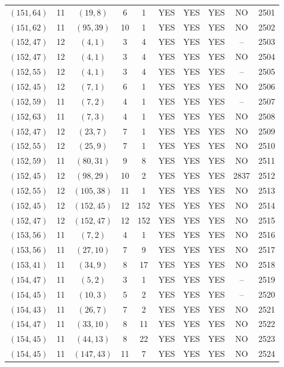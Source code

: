 \begin{longtable}{|c|c|c|c|c|c|c|c|c|c|}
$(151, 64)$ & 11 & $(19, 8)$ & 6 & 1 & YES & YES & YES & NO & 2501\\
$(151, 62)$ & 11 & $(95, 39)$ & 10 & 1 & YES & YES & YES & NO & 2502\\
$(152, 47)$ & 12 & $(4, 1)$ & 3 & 4 & YES & YES & YES & -- & 2503\\
$(152, 47)$ & 12 & $(4, 1)$ & 3 & 4 & YES & YES & YES & NO & 2504\\
$(152, 55)$ & 12 & $(4, 1)$ & 3 & 4 & YES & YES & YES & -- & 2505\\
$(152, 45)$ & 12 & $(7, 1)$ & 6 & 1 & YES & YES & YES & NO & 2506\\
$(152, 59)$ & 11 & $(7, 2)$ & 4 & 1 & YES & YES & YES & -- & 2507\\
$(152, 63)$ & 11 & $(7, 3)$ & 4 & 1 & YES & YES & YES & NO & 2508\\
$(152, 47)$ & 12 & $(23, 7)$ & 7 & 1 & YES & YES & YES & NO & 2509\\
$(152, 55)$ & 12 & $(25, 9)$ & 7 & 1 & YES & YES & YES & NO & 2510\\
$(152, 59)$ & 11 & $(80, 31)$ & 9 & 8 & YES & YES & YES & NO & 2511\\
$(152, 45)$ & 12 & $(98, 29)$ & 10 & 2 & YES & YES & YES & 2837 & 2512\\
$(152, 55)$ & 12 & $(105, 38)$ & 11 & 1 & YES & YES & YES & NO & 2513\\
$(152, 45)$ & 12 & $(152, 45)$ & 12 & 152 & YES & YES & YES & NO & 2514\\
$(152, 47)$ & 12 & $(152, 47)$ & 12 & 152 & YES & YES & YES & NO & 2515\\
$(153, 56)$ & 11 & $(7, 2)$ & 4 & 1 & YES & YES & YES & NO & 2516\\
$(153, 56)$ & 11 & $(27, 10)$ & 7 & 9 & YES & YES & YES & NO & 2517\\
$(153, 41)$ & 11 & $(34, 9)$ & 8 & 17 & YES & YES & YES & NO & 2518\\
$(154, 47)$ & 11 & $(5, 2)$ & 3 & 1 & YES & YES & YES & -- & 2519\\
$(154, 45)$ & 11 & $(10, 3)$ & 5 & 2 & YES & YES & YES & -- & 2520\\
$(154, 43)$ & 11 & $(26, 7)$ & 7 & 2 & YES & YES & YES & NO & 2521\\
$(154, 47)$ & 11 & $(33, 10)$ & 8 & 11 & YES & YES & YES & NO & 2522\\
$(154, 45)$ & 11 & $(44, 13)$ & 8 & 22 & YES & YES & YES & NO & 2523\\
$(154, 45)$ & 11 & $(147, 43)$ & 11 & 7 & YES & YES & YES & NO & 2524\\

\end{longtable}
